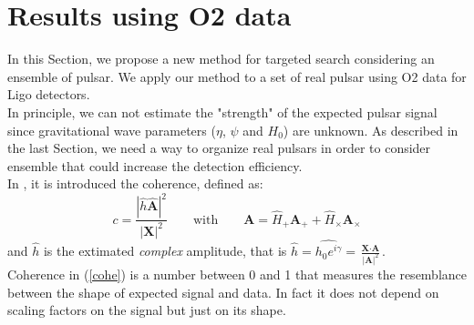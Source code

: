 \documentclass[11pt,a4paper,final]{iopart}
\begin{document}
\section{Results using O2 data} \label{6}
In this Section, we propose a new method for targeted search considering an ensemble of pulsar. We apply our method to a set of real pulsar using O2 data for Ligo detectors.
\\In principle, we can not estimate the "strength" of the expected pulsar signal since gravitational wave parameters ($\eta$, $\psi$ and $H_0$) are unknown. As described in the last Section, we need a way to organize  real pulsars in order to consider ensemble that could increase the detection efficiency. 
\\In \cite{2010}, it is introduced the coherence, defined as:
\begin{equation}\label{cohe}
c=\frac{|\hat{h}\hat{\textbf{A}}|^2}{|\textbf{X}|^2} \qquad \text{with} \qquad \textbf{A}=\hat{H}_+\textbf{A}_++\hat{H}_\times\textbf{A}_\times
\end{equation}
and  $\hat{h}$ is the extimated \textit{complex}  amplitude, that is 
$\hat{h}=\widehat{h_0e^{i\gamma}}=\frac{\textbf{X} \cdot \textbf{A}}{|\textbf{A}|^2}$. 
\\Coherence in (\ref{cohe}) is a number between 0 and 1 that measures the resemblance between the shape of expected signal  and  data.   In  fact  it  does  not  depend  on  scaling  factors  on  the  signal  but  just on  its  shape. 
\end{document}
